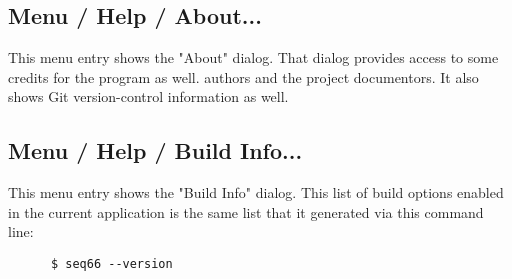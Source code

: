 \subsection{Menu / Help / About...}
\label{subsec:menu_about}

   This menu entry shows the "About" dialog.
   That dialog provides access to some credits for the program as well.
   authors and the project documentors.
   It also shows Git version-control information as well.

\subsection{Menu / Help / Build Info...}
\label{subsec:menu_build_info}

   This menu entry shows the "Build Info" dialog.  This list of
   build options enabled in the current application is the same list
   that it generated via this command line:

   \begin{verbatim}
      $ seq66 --version
   \end{verbatim}

